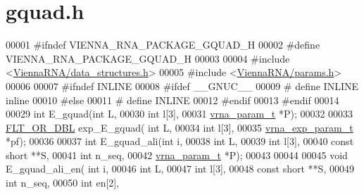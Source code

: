 \hypertarget{gquad_8h_source}{}\section{gquad.\+h}
\label{gquad_8h_source}

\begin{DoxyCode}
00001 \textcolor{preprocessor}{#ifndef VIENNA\_RNA\_PACKAGE\_GQUAD\_H}
00002 \textcolor{preprocessor}{#define VIENNA\_RNA\_PACKAGE\_GQUAD\_H}
00003 
00004 \textcolor{preprocessor}{#include <\hyperlink{data__structures_8h}{ViennaRNA/data\_structures.h}>}
00005 \textcolor{preprocessor}{#include <\hyperlink{params_8h}{ViennaRNA/params.h}>}
00006 
00007 \textcolor{preprocessor}{#ifndef INLINE}
00008 \textcolor{preprocessor}{#ifdef \_\_GNUC\_\_}
00009 \textcolor{preprocessor}{# define INLINE inline}
00010 \textcolor{preprocessor}{#else}
00011 \textcolor{preprocessor}{# define INLINE}
00012 \textcolor{preprocessor}{#endif}
00013 \textcolor{preprocessor}{#endif}
00014 
00029 \textcolor{keywordtype}{int}         E\_gquad(\textcolor{keywordtype}{int} L,
00030                     \textcolor{keywordtype}{int} l[3],
00031                     \hyperlink{group__energy__parameters_structvrna__param__s}{vrna\_param\_t} *P);
00032 
00033 \hyperlink{group__data__structures_ga31125aeace516926bf7f251f759b6126}{FLT\_OR\_DBL} exp\_E\_gquad( \textcolor{keywordtype}{int} L,
00034                         \textcolor{keywordtype}{int} l[3],
00035                         \hyperlink{group__energy__parameters_structvrna__exp__param__s}{vrna\_exp\_param\_t} *pf);
00036 
00037 \textcolor{keywordtype}{int}         E\_gquad\_ali(\textcolor{keywordtype}{int} i,
00038                         \textcolor{keywordtype}{int} L,
00039                         \textcolor{keywordtype}{int} l[3],
00040                         \textcolor{keyword}{const} \textcolor{keywordtype}{short} **S,
00041                         \textcolor{keywordtype}{int} n\_seq,
00042                         \hyperlink{group__energy__parameters_structvrna__param__s}{vrna\_param\_t} *P);
00043 
00044 
00045 \textcolor{keywordtype}{void}        E\_gquad\_ali\_en( \textcolor{keywordtype}{int} i,
00046                             \textcolor{keywordtype}{int} L,
00047                             \textcolor{keywordtype}{int} l[3],
00048                             \textcolor{keyword}{const} \textcolor{keywordtype}{short} **S,
00049                             \textcolor{keywordtype}{int} n\_seq,
00050                             \textcolor{keywordtype}{int} en[2],

\end{DoxyCode}
